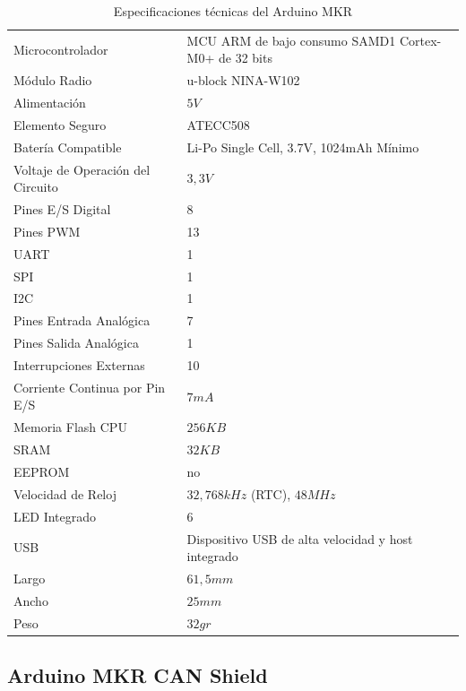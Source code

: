 \begin{table}[H]
    \centering
    \begin{tabular}{|l|p{7cm}|}
        \hline
        \rowcolor{lightgray}
        \multicolumn{2}{|c|}{\textbf{Especificaciones técnicas}} \\
        \hline
        Microcontrolador & MCU ARM de bajo consumo SAMD1 Cortex-M0+ de 32 bits \\
        Módulo Radio & u-block NINA-W102 \\
        Alimentación & \(5 V\) \\
        Elemento Seguro & ATECC508 \\
        Batería Compatible & Li-Po Single Cell, 3.7V, 1024mAh Mínimo \\
        Voltaje de Operación del Circuito & \(3,3 V\) \\
        Pines E/S Digital & 8 \\
        Pines PWM & 13 \\
        UART & 1 \\
        SPI & 1 \\
        I2C & 1 \\
        Pines Entrada Analógica & 7 \\
        Pines Salida Analógica & 1 \\
        Interrupciones Externas & 10 \\
        Corriente Continua por Pin E/S & \(7 mA\) \\
        Memoria Flash CPU & \(256 KB\) \\
        SRAM & \(32 KB\) \\
        EEPROM & no \\
        Velocidad de Reloj & \(32,768 kHz\) (RTC), \(48 MHz\) \\
        LED Integrado & 6 \\
        USB & Dispositivo USB de alta velocidad y host integrado \\
        Largo & \(61,5 mm\) \\
        Ancho & \(25 mm\) \\
        Peso & \(32gr\) \\
        \hline
    \end{tabular}
    \caption{Especificaciones técnicas del Arduino MKR}
    \label{tab:MKR-Especificaciones}
\end{table}

\subsection{Arduino MKR CAN Shield}


